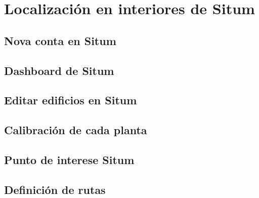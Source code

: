 \chapter{Localización en interiores de Situm}
\section{Nova conta en Situm}
\section{Dashboard de Situm}
\section{Editar edificios en Situm}
\section{Calibración de cada planta}
\section{Punto de interese Situm}
\section{Definición de rutas}